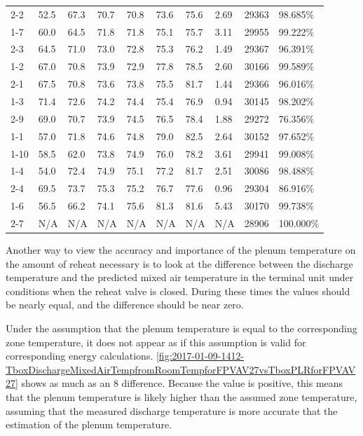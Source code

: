 \begin{table}[]
\begin{tabular}{@{}llllllllll@{}}
2-2  & 52.5 & 67.3 & 70.7 & 70.8 & 73.6 & 75.6 & 2.69 & \num{29363} & 98.685\%         \\
1-7  & 60.0 & 64.5 & 71.8 & 71.8 & 75.1 & 75.7 & 3.11 & \num{29955} & 99.222\%         \\
2-3  & 64.5 & 71.0 & 73.0 & 72.8 & 75.3 & 76.2 & 1.49 & \num{29367} & 96.391\%         \\
1-2  & 67.0 & 70.8 & 73.9 & 72.9 & 77.8 & 78.5 & 2.60 & \num{30166} & 99.589\%         \\
2-1  & 67.5 & 70.8 & 73.6 & 73.8 & 75.5 & 81.7 & 1.44 & \num{29366} & 96.016\%         \\
1-3  & 71.4 & 72.6 & 74.2 & 74.4 & 75.4 & 76.9 & 0.94 & \num{30145} & 98.202\%         \\
2-9  & 69.0 & 70.7 & 73.9 & 74.5 & 76.5 & 78.4 & 1.88 & \num{29272} & 76.356\%         \\
1-1  & 57.0 & 71.8 & 74.6 & 74.8 & 79.0 & 82.5 & 2.64 & \num{30152} & 97.652\%         \\
1-10 & 58.5 & 62.0 & 73.8 & 74.9 & 76.0 & 78.2 & 3.61 & \num{29941} & 99.008\%         \\
1-4  & 54.0 & 72.4 & 74.9 & 75.1 & 77.2 & 81.7 & 2.51 & \num{30086} & 98.488\%         \\
2-4  & 69.5 & 73.7 & 75.3 & 75.2 & 76.7 & 77.6 & 0.96 & \num{29304} & 86.916\%         \\
1-6  & 56.5 & 66.2 & 74.1 & 75.6 & 81.3 & 81.6 & 5.43 & \num{30170} & 99.738\%         \\
2-7  & N/A  & N/A  & N/A  & N/A  & N/A  & N/A  & N/A  & \num{28906} & 100.000\%        \\ \bottomrule
\end{tabular}
\end{table}

Another way to view the accuracy and importance of the plenum
temperature on the amount of reheat necessary is to look at the
difference between the discharge temperature and the predicted mixed air
temperature in the terminal unit under conditions when the reheat valve
is closed.  During these times the values should be nearly equal, and the
difference should be near zero. 

Under the assumption that the plenum temperature is equal to the
corresponding zone temperature, it does not appear as if this assumption
is valid for corresponding energy calculations. \figref{}
\ref{fig:2017-01-09-1412-TboxDischargeMixedAirTempfromRoomTempforFPVAV27vsTboxPLRforFPVAV27}
shows as much as an \SI{8}{\degreeF} difference. Because the value is
positive, this means that the plenum temperature is likely higher than
the assumed zone temperature, assuming that the measured discharge
temperature is more accurate that the estimation of the plenum
temperature. 

